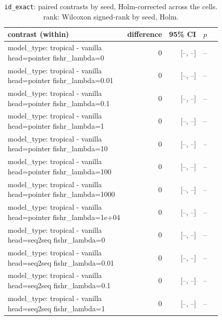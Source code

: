 \documentclass[10pt]{article}
\makeatletter
\newcommand{\stackcell}[1]{\begin{tabular}[t]{@{}l@{}}#1\end{tabular}}
\makeatother
\begin{document}
{\small
\begin{longtable}{lrrrl}
\caption{\texttt{id\_exact}: paired contrasts by seed, Holm-corrected across the cells. rank: Wilcoxon signed-rank by seed, Holm.}\label{tab:paired-id_exact}\\
\toprule
contrast (within) & difference & 95\% CI & $p$ & \\
\midrule
\endhead
\stackcell{model\_type: tropical - vanilla\\\footnotesize head=pointer fishr\_lambda=0 } & 0 & [--, --] & -- & \\
\stackcell{model\_type: tropical - vanilla\\\footnotesize head=pointer fishr\_lambda=0.01 } & 0 & [--, --] & -- & \\
\stackcell{model\_type: tropical - vanilla\\\footnotesize head=pointer fishr\_lambda=0.1 } & 0 & [--, --] & -- & \\
\stackcell{model\_type: tropical - vanilla\\\footnotesize head=pointer fishr\_lambda=1 } & 0 & [--, --] & -- & \\
\stackcell{model\_type: tropical - vanilla\\\footnotesize head=pointer fishr\_lambda=10 } & 0 & [--, --] & -- & \\
\stackcell{model\_type: tropical - vanilla\\\footnotesize head=pointer fishr\_lambda=100 } & 0 & [--, --] & -- & \\
\stackcell{model\_type: tropical - vanilla\\\footnotesize head=pointer fishr\_lambda=1000 } & 0 & [--, --] & -- & \\
\stackcell{model\_type: tropical - vanilla\\\footnotesize head=pointer fishr\_lambda=1e+04 } & 0 & [--, --] & -- & \\
\stackcell{model\_type: tropical - vanilla\\\footnotesize head=seq2seq fishr\_lambda=0 } & 0 & [--, --] & -- & \\
\stackcell{model\_type: tropical - vanilla\\\footnotesize head=seq2seq fishr\_lambda=0.01 } & 0 & [--, --] & -- & \\
\stackcell{model\_type: tropical - vanilla\\\footnotesize head=seq2seq fishr\_lambda=0.1 } & 0 & [--, --] & -- & \\
\stackcell{model\_type: tropical - vanilla\\\footnotesize head=seq2seq fishr\_lambda=1 } & 0 & [--, --] & -- & \\

\end{longtable}}
\end{document}
